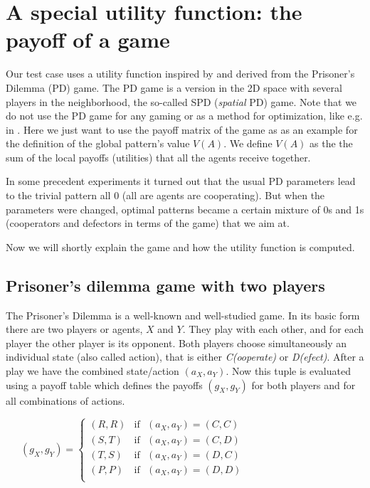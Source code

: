 \documentclass[10pt,a4paper]{article}  %
\begin{document}
\section{A special utility function: the payoff of a game}

Our test case uses a utility function inspired by and derived from the Prisoner's Dilemma (PD) game.
The PD game is a version in the 2D space with several players in the neighborhood, the so-called SPD (\textit{spatial} PD) game.
Note that we do not use the PD game for any gaming or as a method for optimization,
like e.g. in
\cite{Katsumata2008,
Wang2022OptimizationGame}.
Here we just want to use the payoff matrix of the game as as an example
for the definition of the global pattern's value $V(A)$.
We define  $V(A)$ as the the sum of the local payoffs (utilities) that
all the agents receive together.  

In some precedent experiments it turned out that 
the usual PD parameters lead to the trivial pattern all 0 (all are agents are cooperating).
But when the parameters were changed, optimal patterns became a certain mixture of 0s and 1s 
(cooperators and defectors in terms of the game) that we aim at.

Now we will shortly explain the game and how the utility function is computed. 


\subsection{Prisoner's dilemma game with two players}

The Prisoner's Dilemma is a well-known and well-studied game. %
In its basic form there are two players or agents, $X$ and $Y$.
They play with each other, and for each player the other player is its
opponent.
Both players choose simultaneously an individual state (also called action), %
that is either \textit{C(ooperate)} or \textit{D(efect)}.
After a play we have the combined state/action $(a_X,a_Y)$.
Now this tuple is evaluated using a payoff table which
defines the payoffs $(g_X,g_Y)$ for both players and for all combinations
of actions.  


~~~$(g_{X}, g_{Y}) =
\begin{cases}
  (R,R) & \text{if~ } (a_{X}, a_{Y}) = (C,C) \\                      
  (S,T) & \text{if~ } (a_{X}, a_{Y}) = (C,D) \\                      
  (T,S) & \text{if~ } (a_{X}, a_{Y}) = (D,C) \\                      
  (P,P) & \text{if~ } (a_{X}, a_{Y}) = (D,D) \\
\end{cases}$
\end{document}
